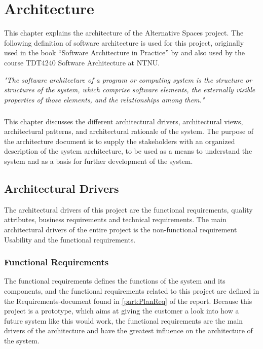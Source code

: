 \chapter{Architecture}
\label{chap:Arch}

This chapter explains the architecture of the Alternative Spaces project. The following definition of software architecture is used for this project, originally used in the book ``Software Architecture in Practice'' by \cite{bass2012software} and also used by the course TDT4240 Software Architecture at NTNU. 
\bigskip
\hfill\begin{minipage}{\dimexpr\textwidth-1cm}
\emph{"The software architecture of a program or computing system is the structure or structures of the system, which comprise software elements, the externally visible properties of those elements, and the relationships among them."}
\end{minipage}

\paragraph{} This chapter discusses the different architectural drivers, architectural views, architectural patterns, and architectural rationale of the system. The purpose of the architecture document is to supply the stakeholders with an organized description of the system architecture, to be used as a means to understand the system and as a basis for further development of the system. 

\newpage
\section{Architectural Drivers}
\label{sec:ArchDrivers}

The architectural drivers of this project are the functional requirements, quality attributes, business requirements and technical requirements. The main architectural drivers of the entire project is the non-functional requirement Usability and the functional requirements. 

\subsection{Functional Requirements}
\label{subsec:ArchDriversFunctional}
The functional requirements defines the functions of the system and its components, and the functional requirements related to this project are defined in the Requirements-document found in \ref{part:PlanReq} of the report. Because this project is a prototype, which aims at giving the customer a look into how a future system like this would work, the functional requirements are the main drivers of the architecture and have the greatest influence on the architecture of the system.

